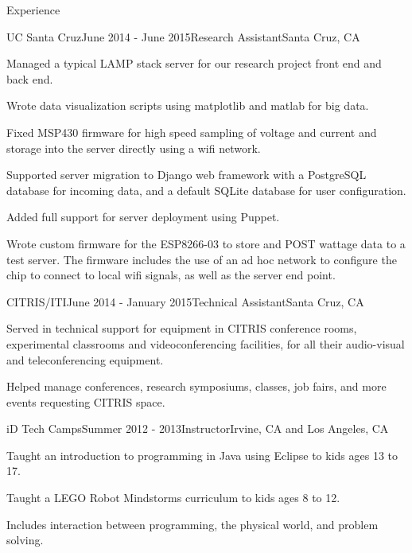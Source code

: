 \documentclass{resume} %
\begin{document}
\begin{rSection}{Experience}

\begin{rSubsection}{UC Santa Cruz}{June 2014 - June 2015}{Research Assistant}{Santa Cruz, CA}
\item Managed a typical LAMP stack server for our research project front end and back end.
\item Wrote data visualization scripts using matplotlib and matlab for big data.
\item Fixed MSP430 firmware for high speed sampling of voltage and current and storage into the server directly using a wifi network.
\item Supported server migration to Django web framework with a PostgreSQL database for incoming data, and a default SQLite database for user configuration.
\item Added full support for server deployment using Puppet.
\item Wrote custom firmware for the ESP8266-03 to store and POST wattage data to a test server. The firmware includes the use of an ad hoc network to configure the chip to connect to local wifi signals, as well as the server end point.
\end{rSubsection}


\begin{rSubsection}{CITRIS/ITI}{June 2014 - January 2015}{Technical Assistant}{Santa Cruz, CA}
\item Served in technical support for equipment in CITRIS conference rooms, experimental classrooms and videoconferencing facilities, for all their audio-visual and teleconferencing equipment.
\item Helped manage conferences, research symposiums, classes, job fairs, and more events requesting CITRIS space.
\end{rSubsection}


\begin{rSubsection}{iD Tech Camps}{Summer 2012 - 2013}{Instructor}{Irvine, CA and Los Angeles, CA}
\item Taught an introduction to programming in Java using Eclipse to kids ages 13 to 17.
\item Taught a LEGO Robot Mindstorms curriculum to kids ages 8 to 12.
\item Includes interaction between programming, the physical world, and problem solving.
\end{rSubsection}

\end{rSection}
\end{document}
